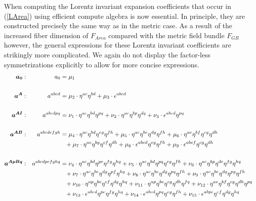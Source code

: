 \documentclass[a4paper,12pt, DIV=14, BCOR=5mm, twoside, headsepline, numbers=noenddot]{scrbook}
\begin{document}
When computing the Lorentz invariant expansion coefficients that occur in (\ref{LArea}) using efficient compute algebra is now essential. In principle, they are constructed precisely the same way as in the metric case. As a result of the increased fiber dimension of $F_{Area}$ compared with the metric field bundle $F_{GR}$ however, the general expressions for these Lorentz invariant coefficients are strikingly more complicated. We again do not display the factor-less symmetrizations explicitly to allow for more concise expressions.
\begin{align}\label{LorentzArea1}
\begin{alignedat}{2}
\boldsymbol{a_0}&: \ \ \ & a_0  &= \mu_1 \\
\\
\boldsymbol{a^{A}}&: \ \ \ & a^{abcd}  &= \mu_2 \cdot \eta^{ac} \eta^{bd} + \mu_{3} \cdot \epsilon^{abcd} \\
\\
\boldsymbol{a^{AI}}&: \ \ \ & a^{abcdpq}  &=  \nu_{1}\cdot\eta^{ac}\eta^{bd}\eta^{pq}+\nu_{2}\cdot\eta^{ac}\eta^{bp}\eta^{dq} + \nu_{3}\cdot\epsilon^{abcd}\eta^{pq}\\
\\
\boldsymbol{a^{AB}}&: \ \ \ & a^{abcdefgh}  &= \mu_{4}\cdot\eta^{ac}\eta^{bd}\eta^{eg}\eta^{fh}+\mu_{5}\cdot\eta^{ac}\eta^{be}\eta^{dg}\eta^{fh}+\mu_{6}\cdot\eta^{ae}\eta^{bf}\eta^{cg}\eta^{dh} \\
& & &\hphantom{=} +\mu_{7}\cdot\eta^{ae}\eta^{bg}\eta^{cf}\eta^{dh} + \mu_{8}\cdot\epsilon^{abcd}\eta^{eg}\eta^{fh}+\mu_{9}\cdot\epsilon^{abef}\eta^{cg}\eta^{dh}\\
\\
\boldsymbol{a^{ApBq}}&: \ \ \ & a^{abcdpefghq}  &=
\nu_{4}\cdot\eta^{ac}\eta^{bd}\eta^{pe}\eta^{fg}\eta^{hq}+\nu_{5}\cdot\eta^{ac}\eta^{bd}\eta^{pq}\eta^{eg}\eta^{fh}+\nu_{6}\cdot\eta^{ac}\eta^{bp}\eta^{de}\eta^{fg}\eta^{hq}\\
& & &\hphantom{=}+\nu_{7}\cdot\eta^{ac}\eta^{be}\eta^{dg}\eta^{pf}\eta^{hq}+\nu_{8}\cdot\eta^{ac}\eta^{be}\eta^{dg}\eta^{pq}\eta^{fh}+\nu_{9}\cdot\eta^{ac}\eta^{be}\eta^{dq}\eta^{pg}\eta^{fh}\\
& & &\hphantom{=}+\nu_{10}\cdot\eta^{ap}\eta^{be}\eta^{cf}\eta^{dg}\eta^{hq}+\nu_{11}\cdot\eta^{ap}\eta^{be}\eta^{cg}\eta^{dh}\eta^{fq}+\nu_{12}\cdot\eta^{ae}\eta^{bf}\eta^{cg}\eta^{dh}\eta^{pq}\\
& & &\hphantom{=} +\nu_{13}\cdot\epsilon^{abcd}\eta^{pe}\eta^{fg}\eta^{hq}+\nu_{14}\cdot\epsilon^{abcd}\eta^{pq}\eta^{eg}\eta^{fh}+\nu_{15}\cdot\epsilon^{abpe}\eta^{cf}\eta^{dg}\eta^{hq}\\

\end{alignedat}
\end{align}
\end{document}
